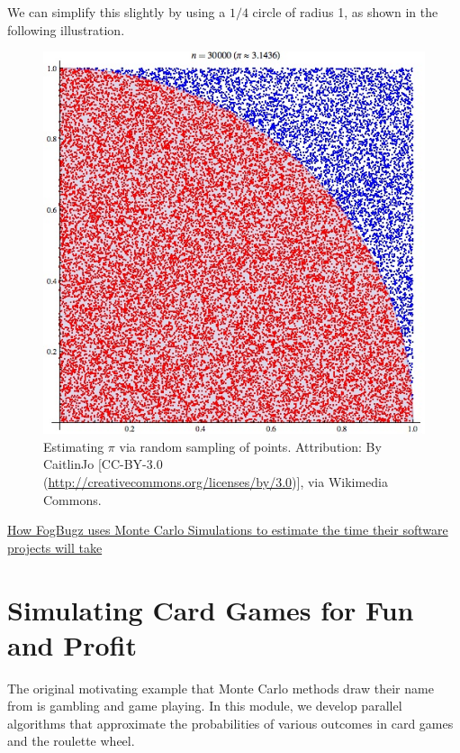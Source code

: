 \documentclass[letterpaper,10pt,openany,oneside]{sphinxmanual}
\begin{document}
We can simplify this slightly by using a $1/4$ circle of radius 1, as shown in the following illustration.
\begin{figure}[htbp]
\centering
\capstart

\includegraphics{Pi_30K_1frame.jpg}
\caption{Estimating $\pi$ via random sampling of points. Attribution: By CaitlinJo {[}CC-BY-3.0 (\href{http://creativecommons.org/licenses/by/3.0}{http://creativecommons.org/licenses/by/3.0}){]}, via Wikimedia Commons.}\end{figure}




\href{http://www.fogcreek.com/fogbugz/evidence-based-scheduling/}{How FogBugz uses Monte Carlo Simulations to estimate the time their software projects will take}




\section{Simulating Card Games for Fun and Profit}
\label{Introduction/Introduction:simulating-card-games-for-fun-and-profit}
The original motivating example that Monte Carlo methods draw their name
from is gambling and game playing. In this module, we develop parallel
algorithms that approximate the probabilities of various outcomes in card
games and the roulette wheel.
\end{document}
